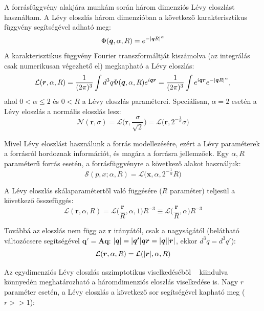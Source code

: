 \documentclass[11pt,a4paper]{article}
\numberwithin{equation}{subsection}
\numberwithin{figure}{section}
\begin{document}
A forrásfüggvény alakjára munkám során három dimenziós Lévy eloszlást használtam. A Lévy eloszlás három dimenzióban a következő karakterisztikus függvény segítségével adható meg:
\begin{equation}
\Phi(\bm{q}, \alpha, R) = e^{-\abs{\bm{q}R}^\alpha}
\end{equation}
A karakterisztikus függvény Fourier transzformáltját kiszámolva (az integrálás csak numerikusan végezhető el) megkapható a Lévy eloszlás:
\begin{equation}
\mathcal{L}(\bm{r},\alpha,R) = \frac{1}{(2\pi)^3}\int d^3q \Phi(\bm{q}, \alpha, R)e^{i\bm{qr}}= \frac{1}{(2\pi)^3}\int e^{i\bm{qr}}e^{-\abs{\bm{q}R}^\alpha},
 \label{eq:Levyint}
\end{equation}
\noindent
ahol $0< \alpha \leq 2$ és $0<R$ a Lévy eloszlás paraméterei. Speciálisan, $\alpha=2$ esetén a Lévy eloszlás a normális eloszlás lesz:
\begin{equation}
\mathcal{N}(\bm{r},\sigma) = \mathcal{L}\bigg(\bm{r}, \frac{\sigma}{\sqrt{2}}\bigg) = \mathcal{L}\big(\bm{r}, 2^{-\frac{1}{\alpha}}\sigma\big)
\end{equation}

Mivel Lévy eloszlást használunk a forrás modellezésére, ezért a Lévy paraméterek a forrásról hordoznak információt, és magára a forrásra jellemzőek. Egy $\alpha, R$ paraméterű forrás esetén, a forrásfüggvényre a következő alakot használjuk:
\begin{equation}
\mathcal{S}(p,x; \alpha, R) =\mathcal{L}\big(\bm{x}, \alpha, 2^{-\frac{1}{\alpha}}R\big)
\end{equation}

A Lévy eloszlás skálaparamétertől való függésére ($R$ paraméter) teljesül a következő összefüggés:
\begin{equation}
\mathcal{L}(\bm{r}, \alpha, R) = \mathcal{L}\bigg(\frac{\bm{r}}{R}, \alpha, 1\bigg)R^{-3}\equiv \mathcal{L}\bigg(\frac{\bm{r}}{R}, \alpha\bigg)R^{-3}
\label{eq:LevyintR}
\end{equation}

Továbbá az eloszlás nem függ az $\bm{r}$ irányától, csak a nagyságától (belátható változócsere segítségével $\bm{q'}=\bm{Aq}$: $\abs{\bm{q}}=\abs{\bm{q'}}\bm{qr}=\abs{\bm{q}}\abs{\bm{r}}$, ekkor $d^3 q=d^3 q'$):
\begin{equation}
\mathcal{L}(\bm{r}, \alpha, R)=\mathcal{L}(\abs{\bm{r}}, \alpha, R)
\label{eq:LevyintO}
\end{equation}

Az egydimenziós Lévy eloszlás aszimptotikus viselkedéséből  ~\cite{LevyEff} kiindulva könnyedén meghatározható a háromdimenziós eloszlás viselkedése is. Nagy $r$ paraméter esetén, a Lévy eloszlás a következő sor segítségével kapható meg ($r>>1$):
\end{document}
